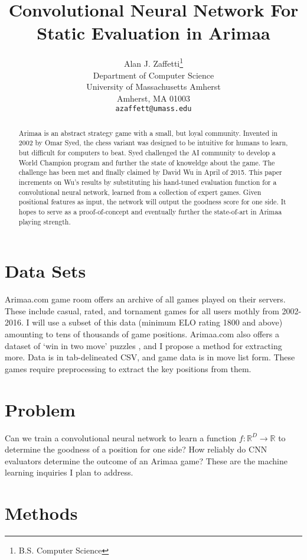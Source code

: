 \documentclass{article}
\title{Convolutional Neural Network For\\Static Evaluation in Arimaa}
\author{
Alan J. Zaffetti\thanks{B.S. Computer Science} \\
Department of Computer Science\\
University of Massachusetts Amherst\\
Amherst, MA 01003 \\
\texttt{azaffett@umass.edu} \\
}
\begin{document}
\maketitle
\begin{abstract}
Arimaa is an abstract strategy game with a small, but loyal community.  Invented in 2002 by Omar Syed, the chess variant was designed to be intuitive for humans to learn, but difficult for computers to beat.  Syed challenged the AI community to develop a World Champion program and further the state of knoweldge about the game.  The challenge has been met and finally claimed by David Wu in April of 2015.  This paper increments on Wu's results by substituting his hand-tuned evaluation function for a convolutional neural network, learned from a collection of expert games.  Given positional features as input, the network will output the goodness score for one side.  It hopes to serve as a proof-of-concept and eventually further the state-of-art in Arimaa playing strength.
\end{abstract}

\section{Data Sets}

Arimaa.com game room \cite{arimaa_com} offers an archive \cite{games} of all games played on their servers.  These include casual, rated, and tornament games for all users mothly from 2002-2016.  I will use a subset of this data (minimum ELO rating 1800 and above) amounting to tens of thousands of game positions.  Arimaa.com also offers a dataset of `win in two move' puzzles \cite{puzzles}, and I propose a method for extracting more.  Data is in tab-delineated CSV, and game data is in move list form.  These games require preprocessing to extract the key positions from them.

\section{Problem}

Can we train a convolutional neural network to learn a function $f: \mathbb{R}^D\rightarrow \mathbb{R}$ to determine the goodness of a position for one side? How reliably do CNN evaluators determine the outcome of an Arimaa game?  These are the machine learning inquiries I plan to address.

\section{Methods}
\end{document}
